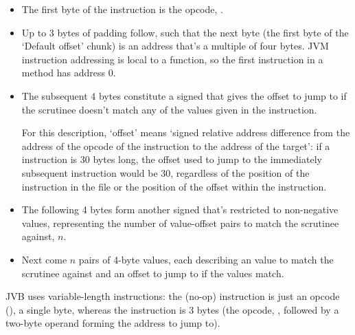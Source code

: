 \documentclass[dissertation.tex]{subfiles}
\begin{document}
{{{            \begin{itemize}
            \item
            {
                The first byte of the instruction is the opcode, .
            }
            \item
            {

                Up to 3 bytes of padding follow, such that the next byte (the first byte of the `Default offset'
                chunk) is an address that's a multiple of four bytes. JVM instruction addressing is local to a
                function, so the first instruction in a method has address 0.

            }
            \item
            {

                The subsequent 4 bytes constitute a signed  that gives the offset to jump to if the
                scrutinee doesn't match any of the values given in the instruction.

                For this description, `offset' means `signed relative address difference from the address of the opcode
                of the instruction to the address of the target': if a  instruction is 30 bytes
                long, the offset used to jump to the immediately subsequent instruction would be 30, regardless of the
                position of the instruction in the file or the position of the offset within the instruction.

            }
            \item
            {

                The following 4 bytes form another signed  that's restricted to non-negative values,
                representing the number of value-offset pairs to match the scrutinee against, \(n\).

            }
            \item
            {

                Next come \(n\) pairs of 4-byte values, each describing an  value to match the scrutinee
                against and an offset to jump to if the values match.

            }
            \end{itemize}

            JVB uses variable-length instructions: the  (no-op) instruction is just an opcode
            (), a single byte, whereas the  instruction is 3 bytes (the opcode,
            , followed by a two-byte operand forming the address to jump to).

}}}
\end{document}

